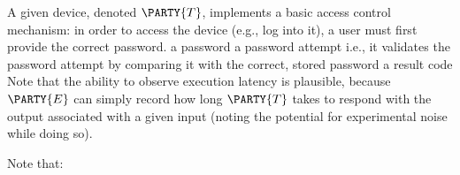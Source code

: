 %



A given device, denoted 
$\PARTY{T}$, 
implements a basic access control mechanism: in order to access the device
(e.g., log into it), 
a user must first provide the correct password.
\DESCINTRO[leak]
{}
{a password}
{a password attempt}
{i.e., it validates the password attempt by comparing it with the correct, stored password}
{a result code}
Note that the ability to observe execution latency is plausible, because
$\PARTY{E}$ 
can simply record how long
$\PARTY{T}$ 
takes to respond with the output associated with a given input (noting the potential for experimental noise while doing so).




%
Note that:

